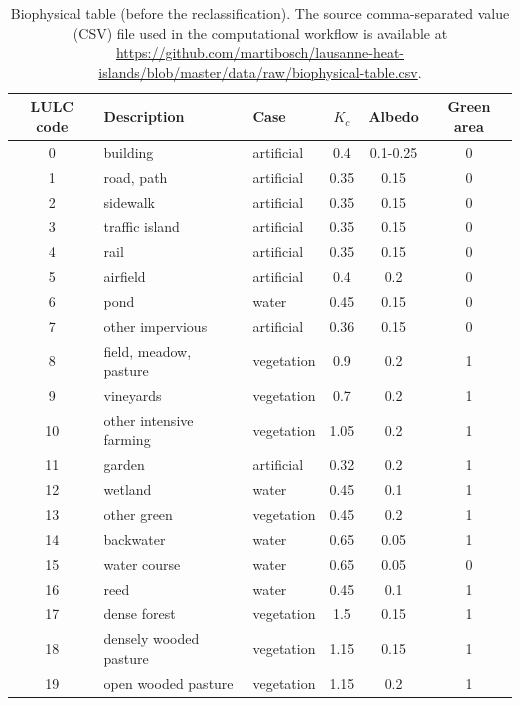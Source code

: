 \documentclass[10pt,letterpaper]{article}
\begin{document}
\begin{table}[!h]
  \begin{adjustwidth}{-.1\textwidth}{0cm}
    \caption{\label{tab:biophysical-table} Biophysical table (before the reclassification). The source comma-separated value (CSV) file used in the computational workflow is available at \url{https://github.com/martibosch/lausanne-heat-islands/blob/master/data/raw/biophysical-table.csv}.}
    \begin{center}
      \begin{tabular}{ c p{} p{} c c c }
        \toprule
        LULC code & Description & Case & $K_c$ & Albedo & Green area \\
        \midrule
        0 & building & artificial & 0.4 & 0.1-0.25 & 0 \\ %
        1 & road, path & artificial & 0.35 & 0.15 & 0 \\ %
        2 & sidewalk & artificial & 0.35 & 0.15 & 0 \\
        3 & traffic island & artificial & 0.35 & 0.15 & 0 \\
        4 & rail & artificial & 0.35 & 0.15 & 0 \\
        5 & airfield & artificial & 0.4 & 0.2 & 0 \\
        6 & pond & water & 0.45 & 0.15 & 0 \\
        7 & other impervious & artificial & 0.36 & 0.15 & 0 \\
        8 & field, meadow, pasture & vegetation & 0.9 & 0.2 & 1 \\
        9 & vineyards & vegetation & 0.7 & 0.2 & 1 \\
        10 & other intensive farming & vegetation & 1.05 & 0.2 & 1 \\
        11 & garden & artificial & 0.32 & 0.2 & 1 \\
        12 & wetland & water & 0.45 & 0.1 & 1 \\
        13 & other green & vegetation & 0.45 & 0.2 & 1 \\
        14 & backwater & water & 0.65 & 0.05 & 1 \\
        15 & water course & water & 0.65 & 0.05 & 0\\
        16 & reed & water & 0.45 & 0.1 & 1\\
        17 & dense forest & vegetation & 1.5 & 0.15 & 1 \\
        18 & densely wooded pasture & vegetation & 1.15 & 0.15 & 1 \\
        19 & open wooded pasture & vegetation & 1.15 & 0.2 & 1 \\

\end{tabular}
\end{center}
\end{adjustwidth}
\end{table}
\end{document}
